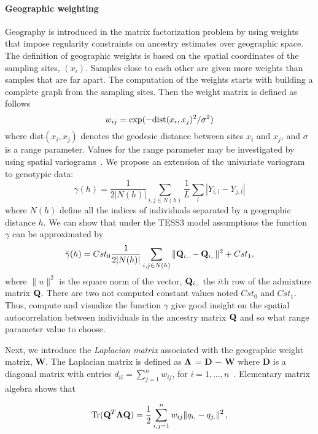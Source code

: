  \paragraph{Geographic weighting} Geography is introduced in the matrix factorization problem by using weights that impose regularity constraints on ancestry estimates over geographic space. The definition of geographic weights is based on the spatial coordinates of the sampling sites, $(x_i)$. Samples close to each other are given more weights than samples that are far apart. The computation of the weights starts with building a complete graph from the sampling sites. Then the weight matrix is defined as follows
$$
w_{ij} = \exp( - {\rm dist}( x_i, x_j )^2/ \sigma^2)
$$
\noindent where dist$( x_i, x_j )$ denotes the geodesic distance between sites $x_i$ and  $x_j$, and $\sigma$ is a range parameter. Values for the range parameter may be investigated by using spatial variograms~\citep{Cressie1993}. We propose an extension of the univariate variogram to genotypic data:
\begin{equation}
\gamma(h) = \frac{1}{2 |N(h)|} \sum_{i,j \in N(h)} \frac{1}{L} \sum_{l} |Y_{i,l} - Y_{j,l}|
\label{eq:gamma}
\end{equation}
\noindent where $N(h)$ define all the indices of individuals separated by a geographic distance $h$. We can show that under the TESS3 model assumptions the function $\gamma$ can be approximated by 
\begin{equation}
\hat{\gamma}(h) = {Cst}_0 \frac{1}{2 |N(h)|} \sum_{i,j \in N(h)} \| {\bf Q}_{i,.} - {\bf Q}_{i,.}\|^2 + {Cst}_1, 
\label{eq:gammahat}
\end{equation}
\noindent where $\|  u \|^2$ is the square norm of the vector, ${\bf Q}_{i,.}$ the $i$th row of the admixture matrix ${\bf Q}$. There are two not computed constant values noted ${Cst}_0$ and ${Cst}_1$. Thus, compute and visualize the function $\gamma$ give good insight on the spatial autocorrelation between individuals in the ancestry matrix ${\bf Q}$ and so what range parameter value to choose.

Next, we introduce the {\it Laplacian matrix} associated with the geographic weight matrix, {\bf W}. The Laplacian matrix is defined as ${\bf \Lambda}$ =  {\bf D} $-$ {\bf W}  where  {\bf D} is a diagonal matrix with entries 
$d_{ii} = \sum_{j = 1}^n w_{ij}$,  for  $i = 1, \dots, n$~\citep{Belkin2003}. Elementary matrix algebra shows that 

$$
 {\rm Tr} ({\bf Q}^T {\bf \Lambda} {\bf Q})  = \frac12 \sum_{i,j = 1}^n  w_{ij}  \|   q_{i.}  - q_{j.} \|^2 \, ,
$$

